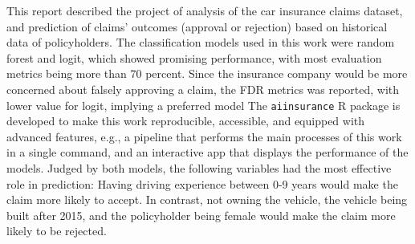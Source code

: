 \documentclass{article}
\begin{document}
This report described the project of analysis of the car insurance
claims dataset, and prediction of claims' outcomes (approval or
rejection) based on historical data of policyholders. The classification
models used in this work were random forest and logit, which showed
promising performance, with most evaluation metrics being more than 70
percent. Since the insurance company would be more concerned about
falsely approving a claim, the FDR metrics was reported, with lower
value for logit, implying a preferred model The \texttt{aiinsurance} R
package \cite{package} is developed to make this work reproducible,
accessible, and equipped with advanced features, e.g., a pipeline that
performs the main processes of this work in a single command, and an
interactive app that displays the performance of the models. Judged by
both models, the following variables had the most effective role in
prediction: Having driving experience between 0-9 years would make the
claim more likely to accept. In contrast, not owning the vehicle, the
vehicle being built after 2015, and the policyholder being female would
make the claim more likely to be rejected.



\end{document}
